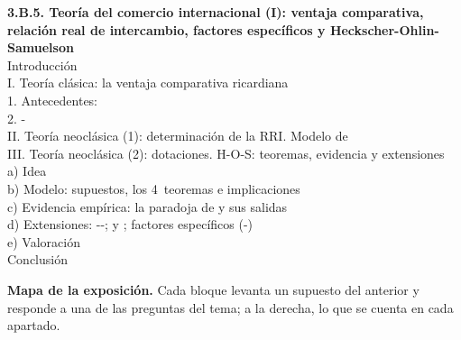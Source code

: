 \documentclass[11pt]{article}
\begin{document}
\begin{esquema}
\textbf{3.B.5. Teoría del comercio internacional (I): ventaja comparativa, relación real de intercambio, factores específicos y Heckscher-Ohlin-Samuelson}\\[2pt]
Introducción\\
I. Teoría clásica: la ventaja comparativa ricardiana\\
\hspace*{1.5em}1. Antecedentes: \\
\hspace*{1.5em}2. -\\
II. Teoría neoclásica (1): determinación de la RRI. Modelo de \\
III. Teoría neoclásica (2): dotaciones. H-O-S: teoremas, evidencia y extensiones\\
\hspace*{1.5em}a) Idea\\
\hspace*{1.5em}b) Modelo: supuestos, los 4~teoremas e implicaciones\\
\hspace*{1.5em}c) Evidencia empírica: la paradoja de  y sus salidas\\
\hspace*{1.5em}d) Extensiones: --;  y ; factores específicos (-)\\
\hspace*{1.5em}e) Valoración\\
Conclusión
\end{esquema}

\begin{anotaciones}
\textbf{Mapa de la exposición.} Cada bloque levanta un supuesto del anterior y responde a una de las preguntas del tema; a la derecha, lo que se cuenta en cada apartado.
\begin{infografiacaja}
\caption{Mapa del tema: la pregunta de cada bloque, sus apartados y el hilo que los une}\label{figu:mapa-tema}
\end{infografiacaja}
\end{anotaciones}
\end{document}

